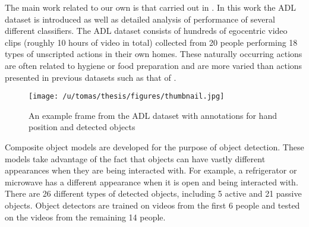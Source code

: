 \documentclass[10pt,twocolumn,letterpaper]{article}
\begin{document}
	The main work related to our own is that carried out in \cite{Ramanan12}. 
	In this work the ADL dataset is introduced as well as detailed analysis of
	performance of several different classifiers. 
  The ADL dataset consists of hundreds of egocentric video clips
	(roughly 10 hours of video in total) collected from 20 people performing
	18 types of unscripted actions in their own homes. These naturally
  occurring
  actions are often related to hygiene or food preparation and are more
  varied than actions presented in previous datasets such as that of \cite{Fathi11}.
	\begin{figure}[t]
		\begin{center}
			  \texttt{[image: /u/tomas/thesis/figures/thumbnail.jpg]}
		\end{center}
    \caption{An example frame from the ADL dataset with annotations for hand
    position and detected objects} 
				\label{fig:long}
				\label{fig:onecol}
	\end{figure}
  Composite object models are developed for the purpose of object detection. 
  These models take advantage of the fact that objects can have vastly
  different appearances when they are being interacted with. For example, a
  refrigerator or microwave has a different appearance when it is open and
  being interacted with. 
  There are 26 different 
	types of detected objects, including 5 active and 21 passive objects. 
  Object detectors are trained on videos from the
  first 6 people and tested on the videos from the remaining 14 people.
  
\end{document}

